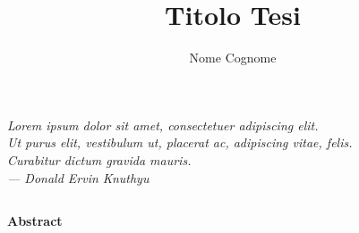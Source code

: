 \documentclass[a4paper,12pt,oneside]{book}
\title{Titolo Tesi}
\author{Nome Cognome}
\theoremstyle{definition}
\theoremstyle{definition}
\newcommand\blankpage{%
	\clearpage
	\thispagestyle{plain}
	\null
	\newpage}
\begin{document}
	

	\thispagestyle{plain}
	
	\frontmatter
	\blankpage
	

	\thispagestyle{plain}
	\null\vspace{\stretch{1}}
	\begin{flushright}
			\slshape
			Lorem ipsum dolor sit amet, consectetuer adipiscing elit. \\
			Ut purus elit, vestibulum ut, placerat ac, adipiscing vitae, felis. \\
			Curabitur dictum gravida mauris. \\ \medskip
		--- Donald Ervin Knuthyu
	\end{flushright}
	
	\null
	\blankpage
	
	
	
	\newpage
	

	\thispagestyle{plain}
	\begin{center}
		\chapter*{}
		{\Huge \textbf{Abstract}}\\
		\vspace{15mm}
		\lipsum[1]
	\end{center}
	\blankpage	
	

	\tableofcontents
	\listoftables
	\listoffigures	
	
\end{document}
